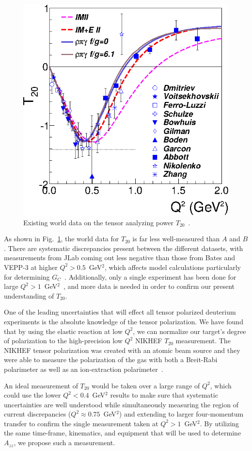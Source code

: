 \begin{figure}
\begin{center}
\includegraphics{figs/t20_data.eps} 
\caption{\label{t20-world}Existing world data on the tensor analyzing power $T_{20}$~\cite{Holt:2012gg}.}
\end{center}
\end{figure}

As shown in Fig.~\ref{t20-world}, the world data for $T_{20}$ is far less well-measured than $A$ and $B$. There are systematic discrepancies present between the different datasets, with measurements from JLab coming out less negative than those from Bates and VEPP-3 at higher $Q^2>0.5$~GeV$^2$, which affects model calculations particularly for determining $G_C$~\cite{Gilman:2001yh}.  Additionally, only a single experiment has been done for large $Q^2>1$~GeV$^2$~\cite{Abbott:2000fg}, and more data is needed in order to confirm our present understanding of $T_{20}$.

One of the leading uncertainties that will effect all tensor polarized deuterium experiments is the absolute knowledge of the tensor polarization.   We have found that by using the elastic reaction at low $Q^2$, we can normalize our target's degree of polarization to the high-precision low $Q^2$ NIKHEF $T_{20}$ measurement.  The NIKHEF tensor polarization was created with an atomic beam source and they were able to measure the polarization of the gas with both a Breit-Rabi polarimeter as well as an ion-extraction polarimeter~\cite{Bouwhuis:1998re}. 

An ideal measurement of $T_{20}$ would be taken over a large range of $Q^2$, which could use the lower $Q^2<0.4$~GeV$^2$ results to make sure that systematic uncertainties are well understood while simultaneously measuring the region of current discrepancies ($Q^2\approx0.75$~GeV$^2$) and extending to larger four-momentum transfer to confirm the single measurement taken at $Q^2>1$~GeV$^2$. By utilizing the same time-frame, kinematics, and equipment that will be used to determine $A_{zz}$, we propose such a measurement.